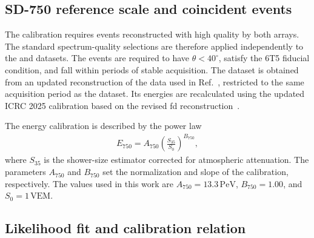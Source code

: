\documentclass[main.tex]{subfiles}
\begin{document}
\subsection{SD-750 reference scale and coincident events}
\label{subsec:calibration_sample}

The calibration requires events reconstructed with high quality by both arrays.
The standard spectrum-quality selections are therefore applied independently to the  and  datasets.
The events are required to have $\theta<40^\circ$, satisfy the 6T5 fiducial condition, and fall within periods of stable acquisition.
The  dataset is obtained from an updated reconstruction of the data used in Ref.~\cite{PierreAuger:2021:InfillSpectrum}, restricted to the same acquisition period as the  dataset.
Its energies are recalculated using the updated ICRC 2025 calibration based on the revised \gls{fd} reconstruction~\cite{PierreAuger:2025:EnergyScale,2026:Verzi:CalibrationSD750}.

The  energy calibration is described by the power law
\begin{align}
    E_{750}
    =
    A_{750}
    \left(
        \frac{S_{35}}{S_0}
    \right)^{B_{750}},
    \label{eq:sd750_cal}
\end{align}
\noindent where $S_{35}$ is the  shower-size estimator corrected for atmospheric attenuation.
The parameters $A_{750}$ and $B_{750}$ set the normalization and slope of the calibration, respectively.
The values used in this work are $A_{750}=13.3\,\mathrm{PeV}$, $B_{750}=1.00$, and $S_0=1\,\mathrm{VEM}$.

\subsection{Likelihood fit and calibration relation}
\label{subsec:calibration_fit}
\end{document}
